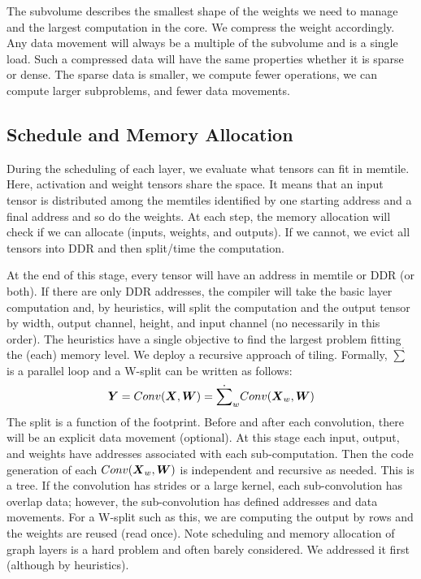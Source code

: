 \documentclass{IEEEtran}
\begin{document}
The subvolume describes the smallest shape of the weights we need to
manage and the largest computation in the core. We compress the weight
accordingly. Any data movement will always be a multiple of the
subvolume and is a single load. Such a compressed data will have the
same properties whether it is sparse or dense. The sparse data is
smaller, we compute fewer operations, we can compute larger
subproblems, and fewer data movements.


\subsection{Schedule and Memory Allocation}
During the scheduling of each layer, we evaluate what tensors can fit
in memtile. Here, activation and weight tensors share the space. It
means that an input tensor is distributed among the memtiles
identified by one starting address and a final address and so do the
weights. At each step, the memory allocation will check if we can
allocate (inputs, weights, and outputs). If we cannot, we evict all
tensors into DDR and then split/time the computation.

At the end of this stage, every tensor will have an address in memtile
or DDR (or both). If there are only DDR addresses, the compiler will
take the basic layer computation and, by heuristics, will split the
computation and the output tensor by width, output channel, height,
and input channel (no necessarily in this order). The heuristics have
a single objective to find the largest problem fitting the (each)
memory level. We deploy a recursive approach of tiling.  Formally,
$\dot{\sum}$ is a parallel loop and a W-split can be written as
follows:
\begin{equation}
  {\boldsymbol Y} =  Conv({\boldsymbol X},{\boldsymbol W}) = \dot{\sum}_w
  Conv({\boldsymbol X}_w,{\boldsymbol W})
\end{equation}
The split is a function of the footprint. Before and after each
convolution, there will be an explicit data movement (optional). At
this stage each input, output, and weights have addresses associated
with each sub-computation. Then the code generation of each
$Conv({\boldsymbol X}_w,{\boldsymbol W})$ is independent and recursive as needed. This
is a tree. If the convolution has strides or a large kernel, each
sub-convolution has overlap data; however, the sub-convolution has
defined addresses and data movements. For a W-split such as this, we
are computing the output by rows and the weights are reused (read
once). Note scheduling and memory allocation of graph layers is a hard
problem and often barely considered. We addressed it first (although
by heuristics).
\end{document}
